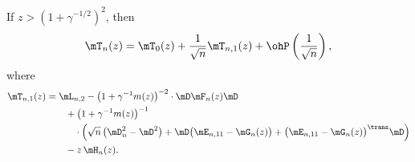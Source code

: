 \begin{lemma}
    If $z > (1 + \gamma^{-1/2})^2$, then
    \[
        \mT_n( z ) 
            = 
                \mT_0( z )
                +
                \frac{1}{\sqrt{n}}
                \mT_{n,1}( z )
                +
                \ohP\left( \frac{1}{\sqrt{n}} \right),
    \]
    where
    \begin{equation*}
        \begin{split}
            \mT_{n,1}( z ) 
                &= \mL_{n,2}
                -
                \big( 1 + \gamma^{-1} m(z) \big)^{-2}
                    \cdot
                    \mD \mF_n(z) \mD \\
                &\quad\quad+ 
                \big( 1 + \gamma^{-1} m(z) \big)^{-1} \\
                    &\quad\quad\quad\cdot
                    \Big(
                        \sqrt{n} \left( \mD_n^2 - \mD^2 \right)
                        +
                        \mD \big( \mE_{n,11} - \mG_n(z) \big)
                        + 
                        \big( \mE_{n,11} - \mG_n(z) \big)^\trans \mD
                    \Big)  \\
                &\quad\quad-
                z \, \mH_n(z).
        \end{split}
    \end{equation*}
\end{lemma}
